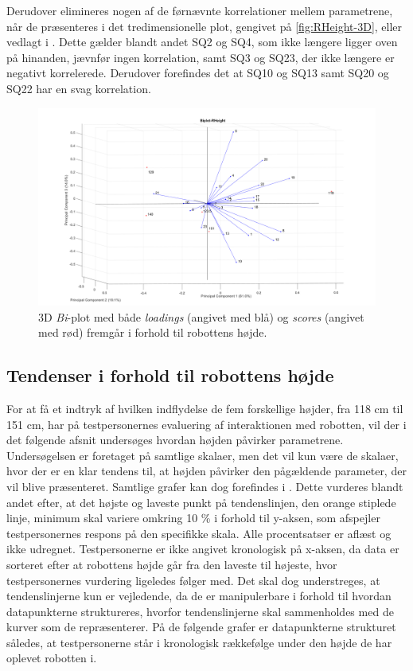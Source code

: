 Derudover elimineres nogen af de førnævnte korrelationer mellem parametrene, når de præsenteres i det tredimensionelle plot, gengivet på \autoref{fig:RHeight-3D}, eller vedlagt i . Dette gælder blandt andet SQ2 og SQ4, som ikke længere ligger oven på hinanden, jævnfør ingen korrelation, samt SQ3 og SQ23, der ikke længere er negativt korrelerede. Derudover forefindes det at SQ10 og SQ13 samt SQ20 og SQ22 har en svag korrelation.   
\begin{figure}[H]
\centering
\includegraphics[width=\textwidth]{Figure/DatabehandlingSkalaer/PCAfigures/RHeight-3D.png}
\caption{3D \textit{Bi}-plot med både \textit{loadings} (angivet med blå) og \textit{scores} (angivet med rød) fremgår i forhold til robottens højde.}
\label{fig:RHeight-3D}
\end{figure}
%

\subsection{Tendenser i forhold til robottens højde}
\label{DatabehandlingRHeightTendenser}
%
For at få et indtryk af hvilken indflydelse de fem forskellige højder, fra 118 cm til 151 cm, har på testpersonernes evaluering af interaktionen med robotten, vil der i det følgende afsnit undersøges hvordan højden påvirker parametrene. Undersøgelsen er foretaget på samtlige skalaer, men det vil kun være de skalaer, hvor der er en klar tendens til, at højden påvirker den pågældende parameter, der vil blive præsenteret. Samtlige grafer kan dog forefindes i . Dette vurderes blandt andet efter, at det højste og laveste punkt på tendenslinjen, den orange stiplede linje, minimum skal variere omkring 10 \% i forhold til y-aksen, som afspejler testpersonernes respons på den specifikke skala. Alle procentsatser er aflæst og ikke udregnet. Testpersonerne er ikke angivet kronologisk på x-aksen, da data er sorteret efter at robottens højde går fra den laveste til højeste, hvor testpersonernes vurdering ligeledes følger med. Det skal dog understreges, at tendenslinjerne kun er vejledende, da de er manipulerbare i forhold til hvordan datapunkterne struktureres, hvorfor tendenslinjerne skal sammenholdes med de kurver som de repræsenterer. På de følgende grafer er datapunkterne strukturet således, at testpersonerne står i kronologisk rækkefølge under den højde de har oplevet robotten i. 

